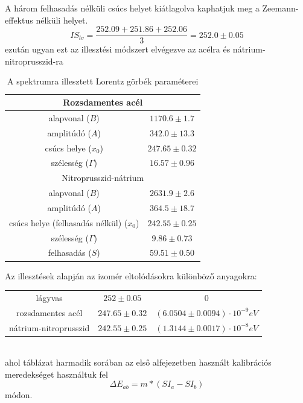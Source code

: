\documentclass[a4paper,12pt]{article}
\numberwithin{equation}{subsection}
\begin{document}
A három felhasadás nélküli csúcs helyet kiátlagolva kaphatjuk meg a Zeemann-effektus nélküli helyet.
\[IS_{lv}=\frac{252.09+251.86+252.06}{3}=252.0 \pm0.05 \]
ezután ugyan ezt az illesztési módszert elvégezve az acélra és nátrium-nitroprusszid-ra
\newpage
\begin{table}[h!]
\centering
\begin{tabular}{|c|c|}

		\multicolumn{2}{c}{Rozsdamentes acél} \\
		\hline
		alapvonal ($B$) & $1170.6 \pm 1.7 $\\
		\hline
		amplitúdó ($A$) & $342.0 \pm 13.3 $\\
		\hline
		csúcs helye ($x_0$) & $247.65 \pm 0.32$\\
		\hline
		szélesség ($\Gamma$) & $16.57 \pm 0.96$\\
		\hline

		\hline
		\multicolumn{2}{c}{Nitroprusszid-nátrium} \\
		\hline
		alapvonal ($B$) & $2631.9 \pm 2.6 $\\
		\hline
		amplitúdó ($A$) & $364.5 \pm 18.7 $\\
		\hline
		csúcs helye (felhasadás nélkül) ($x_0$) & $242.55 \pm 0.25$\\
		\hline
		szélesség ($\Gamma$) & $9.86 \pm 0.73$\\
		\hline
		felhasadás ($S$) & $59.51 \pm 0.50$ \\
		\hline

\end{tabular}
\caption{A spektrumra illesztett Lorentz görbék paraméterei}
\end{table}

 Az illesztések alapján az izomér eltolódásokra különböző anyagokra:
\begin{table}[h!]
\centering
\begin{tabular}{c||c|c}
lágyvas&$252\pm0.05$& 0\\
rozsdamentes acél&$247.65\pm0.32$&$(6.0504\pm0.0094)\cdot10^{-9} eV$ \\
nátrium-nitroprusszid&$242.55\pm0.25$&$(1.3144\pm0.0017)\cdot10^{-8}eV$ \\
\end{tabular}
\end{table}
\\
ahol táblázat harmadik sorában az első alfejezetben használt kalibrációs meredekséget használtuk fel \[\Delta E_{ab}=m*(SI_a-SI_b)\]módon. 
\end{document}
